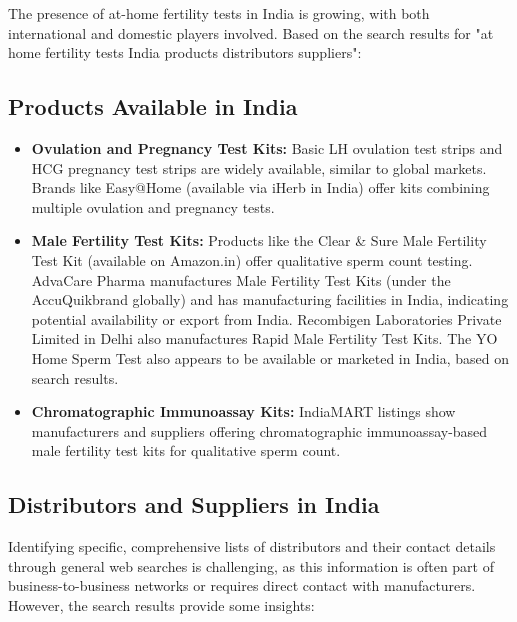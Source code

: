 \documentclass{article}
\begin{document}
The presence of at-home fertility tests in India is growing, with both international and domestic players involved. Based on the search results for "at home fertility tests India products distributors suppliers":

\subsection{Products Available in India}
\begin{itemize}
    \item \textbf{Ovulation and Pregnancy Test Kits:} Basic LH ovulation test strips and HCG pregnancy test strips are widely available, similar to global markets. Brands like Easy@Home (available via iHerb in India) offer kits combining multiple ovulation and pregnancy tests.
    \item \textbf{Male Fertility Test Kits:} Products like the Clear \& Sure Male Fertility Test Kit (available on Amazon.in) offer qualitative sperm count testing. AdvaCare Pharma manufactures Male Fertility Test Kits (under the AccuQuik\texttrademark brand globally) and has manufacturing facilities in India, indicating potential availability or export from India. Recombigen Laboratories Private Limited in Delhi also manufactures Rapid Male Fertility Test Kits. The YO Home Sperm Test also appears to be available or marketed in India, based on search results.
    \item \textbf{Chromatographic Immunoassay Kits:} IndiaMART listings show manufacturers and suppliers offering chromatographic immunoassay-based male fertility test kits for qualitative sperm count.
\end{itemize}

\subsection{Distributors and Suppliers in India}
Identifying specific, comprehensive lists of distributors and their contact details through general web searches is challenging, as this information is often part of business-to-business networks or requires direct contact with manufacturers. However, the search results provide some insights:
\end{document}

